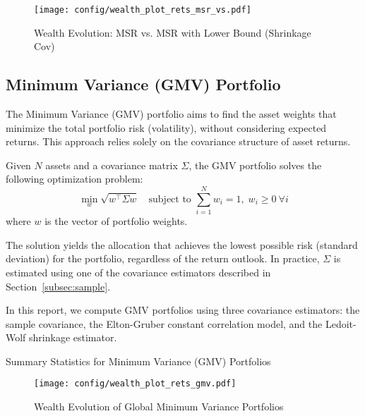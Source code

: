 \documentclass{article}
\begin{document}
\begin{figure}[htbp]
    \centering
    \texttt{[image: config/wealth\_plot\_rets\_msr\_vs.pdf]}
    \caption{Wealth Evolution: MSR vs. MSR with Lower Bound (Shrinkage Cov)}
    \label{fig:wealth_msr_vs}
\end{figure}



\newpage
\subsection{Minimum Variance (GMV) Portfolio}

The Minimum Variance (GMV) portfolio aims to find the asset weights that minimize the total portfolio risk (volatility), without considering expected returns. This approach relies solely on the covariance structure of asset returns.

Given $N$ assets and a covariance matrix $\Sigma$, the GMV portfolio solves the following optimization problem:
\[
\min_{w} \sqrt{w^\top \Sigma w}
\quad \text{subject to } \sum_{i=1}^N w_i = 1, \; w_i \geq 0 \ \forall i
\]
where $w$ is the vector of portfolio weights.

The solution yields the allocation that achieves the lowest possible risk (standard deviation) for the portfolio, regardless of the return outlook. In practice, $\Sigma$ is estimated using one of the covariance estimators described in Section~\ref{subsec:sample}.

In this report, we compute GMV portfolios using three covariance estimators: the sample covariance, the Elton-Gruber constant correlation model, and the Ledoit-Wolf shrinkage estimator.

\begin{table}[htbp]
\centering
\caption{Summary Statistics for Minimum Variance (GMV) Portfolios}
\label{tab:stats_gmv}
\begin{adjustbox}{max width=\textwidth}
    
\end{adjustbox}
\end{table}



\begin{figure}[htbp]
    \centering
    \texttt{[image: config/wealth\_plot\_rets\_gmv.pdf]}
    \caption{Wealth Evolution of Global Minimum Variance Portfolios}
    \label{fig:wealth_gmv}
\end{figure}

\newpage
\end{document}
